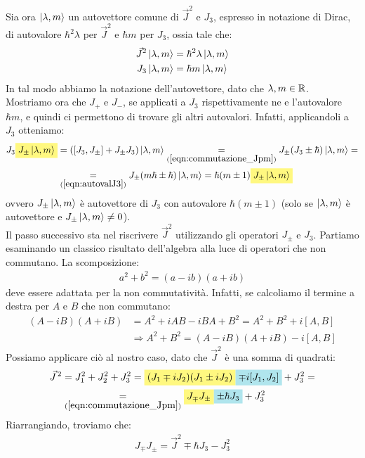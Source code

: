 \documentclass[../../FisicaTeorica.tex]{subfiles}
\begin{document}
Sia ora $\ket{\lambda,m}$ un autovettore comune di $\vec{J}^2$ e $J_3$, espresso in notazione di Dirac, di autovalore $\hbar^2 \lambda$ per $\vec{J}^2$ e $\hbar m$ per $J_3$, ossia tale che:
\begin{align}
\vec{J}^2 \ket{\lambda,m} &= \hbar^2 \lambda \ket{\lambda,m}
\label{eqn:autovalJquadro}
\\
J_3 \ket{\lambda,m} &=\hbar m \ket{\lambda,m} 
\label{eqn:autovalJ3}
\end{align}
In tal modo abbiamo  la notazione dell'autovettore, dato che $\lambda, m \in \mathbb{R}$.\\
Mostriamo ora che $J_+$ e $J_-$, se applicati a $J_3$ rispettivamente ne  e  l'autovalore $\hbar m$, e quindi ci permettono di trovare gli altri autovalori. Infatti, applicandoli a $J_3$ otteniamo:
\begin{align}\nonumber
J_3 \hlc{Yellow}{J_{\pm} \ket{\lambda,m}} &= ([J_3,J_\pm]+J_\pm J_3)\ket{\lambda,m} \underset{(\ref{eqn:commutazione_Jpm})}{=}
J_\pm (J_3 \pm \hbar) \ket{\lambda, m} = \\
&\underset{(\ref{eqn:autovalJ3})}{=} J_\pm (m\hbar \pm \hbar) \ket{\lambda,m} = \hbar(m\pm 1)\hlc{Yellow}{ J_{\pm}\ket{\lambda,m}} \label{eqn:autovalore_aumentato}
\end{align}
ovvero $J_\pm\ket{\lambda,m}$ è autovettore di $J_3$ con autovalore $\hbar(m\pm 1)$ (solo se $\ket{\lambda,m}$ è autovettore e $J_\pm \ket{\lambda,m}\neq 0$).\\ %

Il passo successivo sta nel riscrivere $\vec{J}^2$ utilizzando gli operatori $J_\pm$ e $J_3$. Partiamo esaminando un classico risultato dell'algebra alla luce di operatori che non commutano. La scomposizione:
\begin{align*}
a^2 + b^2 = (a-ib)(a+ib)
\end{align*}
deve essere adattata per la non commutatività. Infatti, se calcoliamo il termine a destra per $A$ e $B$ che non commutano:
\begin{align*}
(A-iB)(A+iB)&=A^2 +iAB - iBA +B^2=A^2 +B^2 +i[A,B]\\
&\Rightarrow A^2+B^2 = (A-iB)(A+iB)-i[A,B]
\end{align*}
Possiamo applicare ciò al nostro caso, dato che $\vec{J}^2$ è una somma di quadrati:
\begin{align}\nonumber
\vec{J}^{\,2}&= J_1^2 + J_2^2 + J_3^2 = \hlc{Yellow}{(J_1 \mp i J_2)(J_1 \pm i J_2)} \hlc{SkyBlue}{\mp i [J_1,J_2]}+J_3^2 =\\
&\underset{(\ref{eqn:commutazione_Jpm})}{=} \hlc{Yellow}{J_\mp J_\pm} \hlc{SkyBlue}{\pm \hbar J_3} + J_3^2 \label{eqn:Jquadro}
\end{align}
Riarrangiando, troviamo che:
\begin{align}
J_\mp J_\pm = \vec{J}^2 \mp \hbar J_3 - J_3^2
\label{eqn:jpjm}
\end{align}
\end{document}

